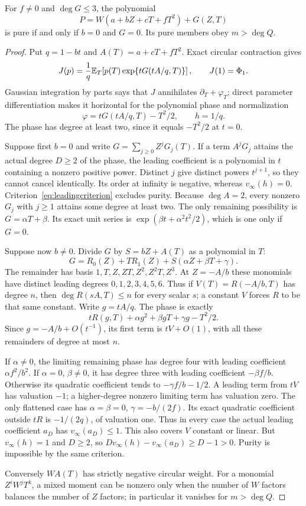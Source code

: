 \begin{proposition}\label{prop:rankoneformal}
For $f\ne0$ and $\deg G\leq3$, the polynomial
\[
 P=W(a+bZ+cT+fT^2)+G(Z,T)
\]
is pure if and only if $b=0$ and $G=0$. Its pure members obey
$m>\deg Q$.
\end{proposition}
\begin{proof}
Put $q=1-bt$ and $A(T)=a+cT+fT^2$. Exact circular contraction
gives
\[
 J(p)=\frac1q\mathbb E_T\!\left[p(T)
             \exp\{tG(tA/q,T)\}\right],\qquad J(1)=\Phi_1.
\]
Gaussian integration by parts says that $J$ annihilates
$\partial_T+\varphi_T$; direct parameter differentiation makes it
horizontal for the polynomial phase and normalization
\[
 \varphi=tG(tA/q,T)-T^2/2,\qquad h=1/q.
\]
The phase has degree at least two, since it equals $-T^2/2$ at $t=0$.

Suppose first $b=0$ and write $G=\sum_{j\geq0}Z^jG_j(T)$.
If a term $A^jG_j$ attains the actual degree $D\geq2$ of the phase,
the leading coefficient is a polynomial in $t$ containing a
nonzero positive power. Distinct $j$ give distinct powers $t^{j+1}$,
so they cannot cancel identically. Its order at infinity is negative,
whereas $v_\infty(h)=0$. Criterion~\eqref{eq:leadingcriterion}
excludes purity. Because $\deg A=2$, every nonzero $G_j$ with
$j\geq1$ attains some degree at least two. The only remaining
possibility is $G=\alpha T+\beta$. Its exact unit series is
$\exp(\beta t+\alpha^2t^2/2)$, which is one only if $G=0$.

Suppose now $b\ne0$. Divide $G$ by $S=bZ+A(T)$ as a polynomial
in $T$:
\[
 G=R_0(Z)+TR_1(Z)+S(\alpha Z+\beta T+\gamma).
\]
The remainder has basis $1,T,Z,ZT,Z^2,Z^2T,Z^3$. At $Z=-A/b$
these monomials have distinct leading degrees $0,1,2,3,4,5,6$.
Thus if $V(T)=R(-A/b,T)$ has degree $n$, then
$\deg R(sA,T)\leq n$ for every scalar $s$; a constant $V$
forces $R$ to be that same constant. Write $g=tA/q$. The phase is
exactly
\[
 tR(g,T)+\alpha g^2+\beta gT+\gamma g-T^2/2.
\]
Since $g=-A/b+O(t^{-1})$, its first term is $tV+O(1)$, with
all these remainders of degree at most $n$.

If $\alpha\ne0$, the limiting remaining phase has degree four
with leading coefficient $\alpha f^2/b^2$. If $\alpha=0$,
$\beta\ne0$, it has degree three with leading coefficient
$-\beta f/b$. Otherwise its quadratic coefficient tends to
$-\gamma f/b-1/2$. A leading term from $tV$ has valuation $-1$;
a higher-degree nonzero limiting term has valuation zero.
The only flattened case has
$\alpha=\beta=0$, $\gamma=-b/(2f)$. Its exact quadratic
coefficient outside $tR$ is $-1/(2q)$, of valuation one.
Thus in every case the actual leading coefficient $a_D$ has
$v_\infty(a_D)\leq1$. This also covers $V$ constant or linear.
But $v_\infty(h)=1$ and $D\geq2$, so
$Dv_\infty(h)-v_\infty(a_D)\geq D-1>0$.
Purity is impossible by the same criterion.

Conversely $W A(T)$ has strictly negative circular weight.
For a monomial $Z^iW^jT^k$, a mixed moment can be nonzero only
when the number of $W$ factors balances the number of $Z$ factors;
in particular it vanishes for $m>\deg Q$.
\end{proof}
